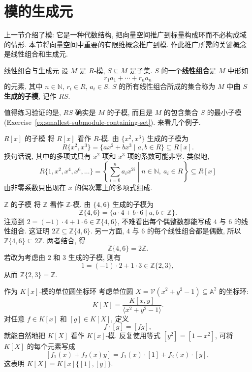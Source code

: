 \section{模的生成元}\label{sec:module-generators}

上一节介绍了模: 它是一种代数结构, 把向量空间推广到标量构成环而不必构成域的情形. 本节将向量空间中重要的有限维概念推广到模. 作此推广所需的关键概念是线性组合和生成元.

\begin{Definition}{线性组合与生成元}\leavevmode\label{def:module-linear-combination}
  设 $M$ 是 $R$-模, $S\subseteq M$ 是子集. $S$ 的一个\textbf{线性组合}是 $M$ 中形如
  \[
    r_{1}a_{1}+\cdots+r_{n}a_{n}
  \]
  的元素, 其中 $n\in\mathbb{N}$, $r_{i}\in R$, $a_{i}\in S$. $S$ 的所有线性组合所成的集合称为 $M$ 中\textbf{由 $S$ 生成的子模}, 记作 $RS$.
\end{Definition}

值得练习验证的是, $RS$ 确实是 $M$ 的子模, 而且是 $M$ 的包含集合 $S$ 的最小子模 (Exercise~\ref{ex:smallest-submodule-containing-set}). 来看几个例子.

\begin{Example}{{\textmd{$R[x]$} 的子模}}\leavevmode\label{ex:submodules-of-polynomial-ring}
  将 $R[x]$ 看作 $R$-模. 由 $\{x^{2},x^{3}\}$ 生成的子模为
  \[
    R\{x^{2},x^{3}\}=\{ax^{2}+bx^{3}\mid a,b\in R\}\subseteq R[x].
  \]
  换句话说, 其中的多项式只有 $x^{2}$ 项和 $x^{3}$ 项的系数可能非零. 类似地,
  \[
    R\{1,x^{2},x^{4},x^{6},\ldots\}=
       \left\{\sum_{i=0}^{n}a_{i}x^{2i}\mathrel{}\middle|\mathrel{}n\in\mathbb{N},\ a_{i}\in R\right\}\subseteq R[x]
  \]
  由非零系数只出现在 $x$ 的偶次幂上的多项式组成.
\end{Example}

\begin{Example}{$\mathbb{Z}$ 的子模}\leavevmode\label{ex:integer-submodule-generators}
  将 $\mathbb{Z}$ 看作 $\mathbb{Z}$-模. 由 $\{4,6\}$ 生成的子模为
  \[
    \mathbb{Z}\{4,6\}=\{a\cdot4+b\cdot6\mid a,b\in\mathbb{Z}\}.
  \]
  注意到 $2=(-1)\cdot4+1\cdot6\in\mathbb{Z}\{4,6\}$, 不难看出每个偶整数都能写成 $4$ 与 $6$ 的线性组合. 这证明 $2\mathbb{Z}\subseteq\mathbb{Z}\{4,6\}$. 另一方面, $4$ 与 $6$ 的每个线性组合都是偶数, 所以 $\mathbb{Z}\{4,6\}\subseteq2\mathbb{Z}$. 两者结合, 得
  \[
    \mathbb{Z}\{4,6\}=2\mathbb{Z}.
  \]
  若改为考虑由 $2$ 和 $3$ 生成的子模, 则有
  \[
    1=(-1)\cdot2+1\cdot3\in\mathbb{Z}\{2,3\},
  \]
  从而 $\mathbb{Z}\{2,3\}=\mathbb{Z}$.
\end{Example}

\begin{Example}{{作为 \textmd{$K[x]$}-模的单位圆坐标环}}\leavevmode\label{ex:circle-coordinate-ring-module}
  考虑单位圆 $X=\mathcal{V}(x^{2}+y^{2}-1)\subseteq\mathbb{A}^{2}$ 的坐标环:
  \[
    K[X]=\frac{K[x,y]}{\langle x^{2}+y^{2}-1\rangle}.
  \]
  对任意 $f\in K[x]$ 和 $[g]\in K[X]$, 定义
  \[
    f\cdot[g]=[fg],
  \]
  就能自然地把 $K[X]$ 看作 $K[x]$-模. 反复使用等式 $[y^{2}]=[1-x^{2}]$, 可将 $K[X]$ 的每个元素写成
  \[
    [f_{1}(x)+f_{2}(x)y]=f_{1}(x)\cdot[1]+f_{2}(x)\cdot[y],
  \]
  这表明 $K[X]=K[x]\{[1],[y]\}$.
\end{Example}

